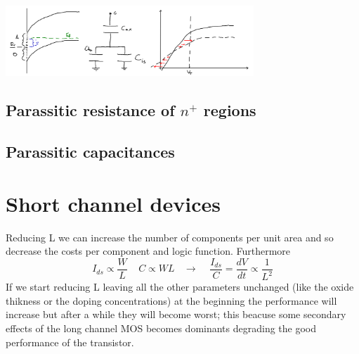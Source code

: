 \centering
\includegraphics[width=0.7\textwidth]{interfacest.png}\\
\raggedright

\subsection{Parassitic resistance of $n^+$ regions}
\subsection{Parassitic capacitances}

\section{Short channel devices}
Reducing L we can increase the number of components per unit area and so decrease the costs per component and logic function. Furthermore
\begin{equation}
I_{ds}\propto \frac{W}{L} \ \ \ \ \ C\propto WL \ \ \ \ \rightarrow \ \ \ \ \ \frac{I_{ds}}{C}=\frac{dV}{dt}\propto \frac{1}{L^2}
\end{equation}
If we start reducing L leaving all the other parameters unchanged (like the oxide thikness or the doping concentrations) at the beginning the performance will increase but after a while they will become worst; this beacuse some secondary effects of the long channel MOS becomes dominants degrading the good performance of the transistor.

